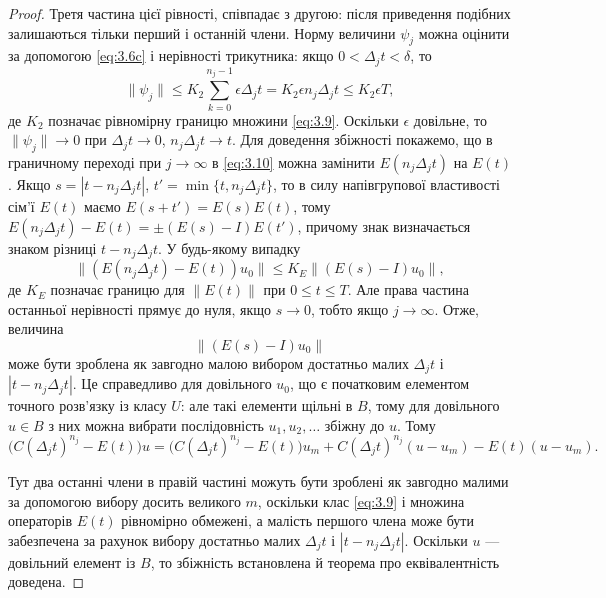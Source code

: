 \begin{proof}
    Третя частина цієї рівності, співпадає з другою: після приведення подібних залишаються тільки перший і останній члени. Норму величини $\psi_j$ можна оцінити за допомогою \eqref{eq:3.6c} і нерівності трикутника: якщо $0 < \Delta_j t < \delta$, то
    \begin{equation}
        \label{eq:3.11}
        \|\psi_j\| \le K_2 \sum_{k = 0}^{n_j - 1} \epsilon \Delta_j t = K_2 \epsilon n_j \Delta_j t \le K_2 \epsilon T,
    \end{equation}
    де $K_2$ позначає рівномірну границю множини \eqref{eq:3.9}. Оскільки $\epsilon$ довільне, то $\|\psi_j\| \to 0$ при $\Delta_j t \to 0$, $n_j \Delta_j t \to t$. Для доведення збіжності покажемо, що в граничному переході при $j \to \infty$ в \eqref{eq:3.10} можна замінити $E(n_j \Delta_j t)$ на $E(t)$. Якщо $s = |t - n_j \Delta_j t|$, $t' = \min\{t, n_j \Delta_j t\}$, то в силу напівгрупової властивості сім'ї $E(t)$ маємо $E(s + t') = E(s) E(t)$, тому $E(n_j \Delta_j t) - E(t) = \pm (E(s) - I) E(t')$, причому знак визначається знаком різниці $t - n_j \Delta_j t$. У будь-якому випадку
    \begin{equation}
        \| (E(n_j \Delta_j t) - E(t)) u_0 \| \le K_E \| (E(s) - I) u_0 \|,
    \end{equation}
    де $K_E$ позначає границю для $\|E(t)\|$ при $0 \le t \le T$. Але права частина останньої нерівності прямує до нуля, якщо $s \to 0$, тобто якщо $j \to \infty$. Отже, величина 
    \begin{equation}
        \| (E(s) - I) u_0 \|
    \end{equation}
    може бути зроблена як завгодно малою вибором достатньо малих $\Delta_j t$ і $|t - n_j \Delta_j t|$. Це справедливо для довільного $u_0$, що є початковим елементом точного розв'язку із класу $U$: але такі елементи щільні в $B$, тому для довільного $u \in B$ з них можна вибрати послідовність $u_1, u_2, \ldots$ збіжну до $u$. Тому
    \begin{equation}
        \label{eq:3.12}
        \Big( C(\Delta_j t)^{n_j} - E(t) \Big) u = \Big( C(\Delta_j t)^{n_j} - E(t) \Big) u_m + C(\Delta_j t)^{n_j} (u - u_m) - E(t) (u - u_m).
    \end{equation}
    
    Тут два останні члени в правій частині можуть бути зроблені як завгодно малими за допомогою вибору досить великого $m$, оскільки клас \eqref{eq:3.9} і множина операторів $E(t)$ рівномірно обмежені, а малість першого члена може бути забезпечена за рахунок вибору достатньо малих $\Delta_j t$ і $|t - n_j \Delta_j t|$. Оскільки $u$ --- довільний елемент із $B$, то збіжність встановлена й теорема про еквівалентність доведена.
\end{proof}

